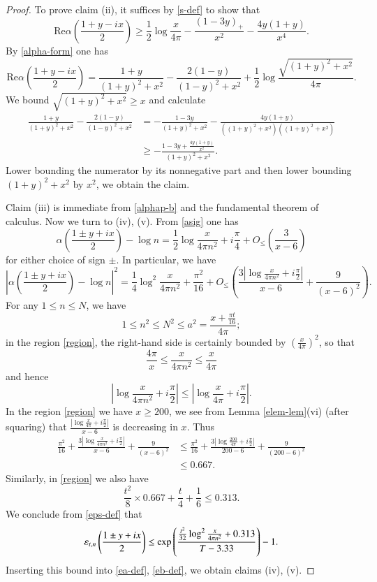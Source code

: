 \begin{proof}
To prove claim (ii), it suffices by \eqref{s-def} to show that
$$ \mathrm{Re} \alpha(\frac{1+y-ix}{2}) \geq \frac{1}{2} \log \frac{x}{4\pi} - \frac{(1-3y)_+}{x^2} - \frac{4y(1+y)}{x^4}.$$
By \eqref{alpha-form} one has
$$ \mathrm{Re} \alpha(\frac{1+y-ix}{2}) = \frac{1+y}{(1+y)^2+x^2} - \frac{2(1-y)}{(1-y)^2+x^2} + \frac{1}{2} \log \frac{\sqrt{(1+y)^2+x^2}}{4\pi}.$$
We bound $\sqrt{(1+y)^2+x^2} \geq x$ and calculate
\begin{align*}
 \frac{1+y}{(1+y)^2+x^2} - \frac{2(1-y)}{(1-y)^2+x^2} &= - \frac{1-3y}{(1+y)^2+x^2} -\frac{4y(1+y)}{((1+y)^2+x^2)((1+y)^2+x^2)} \\
&\geq - \frac{1-3y+\frac{4y(1+y)}{x^2}}{(1+y)^2+x^2}.
\end{align*}
Lower bounding the numerator by its nonnegative part and then lower bounding $(1+y)^2+x^2$ by $x^2$, we obtain the claim.

Claim (iii) is immediate from \eqref{alphap-b} and the fundamental theorem of calculus.  Now we turn to (iv), (v).  From \eqref{asig} one has
$$ \alpha(\frac{1 \pm y + ix}{2}) - \log n = \frac{1}{2} \log \frac{x}{4\pi n^2} + i \frac{\pi}{4} + O_{\leq}\left( \frac{3}{x-6}\right)$$
for either choice of sign $\pm$.  In particular, we have
\begin{equation}\label{alphn}
 |\alpha(\frac{1 \pm y + ix}{2}) - \log n|^2 = \frac{1}{4} \log^2 \frac{x}{4\pi n^2} + \frac{\pi^2}{16} + 
O_{\leq}\left( \frac{3 |\log \frac{x}{4\pi n^2} + i \frac{\pi}{2}|}{x-6} + \frac{9}{(x-6)^2}\right).
\end{equation}
For any $1 \leq n \leq N$, we have
$$ 1 \leq n^2 \leq N^2 \leq a^2 = \frac{x+\frac{\pi t}{16}}{4\pi};$$
in the region \eqref{region}, the right-hand side is certainly bounded by $(\frac{x}{4\pi})^2$, so that
$$ \frac{4\pi}{x} \leq \frac{x}{4\pi n^2} \leq \frac{x}{4\pi}$$
and hence
$$ |\log \frac{x}{4\pi n^2} + i \frac{\pi}{2}| \leq |\log \frac{x}{4\pi} + i \frac{\pi}{2}|.$$
In the region \eqref{region} we have  $x \geq 200$, we see from Lemma \ref{elem-lem}(vi) (after squaring) that $\frac{|\log \frac{x}{4\pi} + i \frac{\pi}{2}|}{x-6}$ is decreasing in $x$.  Thus
\begin{align*}
\frac{\pi^2}{16} + \frac{3 |\log \frac{x}{4\pi n^2} + i \frac{\pi}{2}|}{x-6} + \frac{9}{(x-6)^2}
&\leq \frac{\pi^2}{16} +  \frac{3 |\log \frac{200}{4\pi} + i \frac{\pi}{2}|}{200-6} + \frac{9}{(200-6)^2} \\
&\leq 0.667.
\end{align*}
Similarly, in \eqref{region} we also have
$$ \frac{t^2}{8} \times 0.667 + \frac{t}{4} + \frac{1}{6} \leq 0.313.$$ 
We conclude from \eqref{eps-def} that
$$
\varepsilon_{t,n}\left(\frac{1 \pm y + ix}{2} \right) \leq \exp\left( \frac{\frac{t^2}{32} \log^2 \frac{x}{4\pi n^2} + 0.313}{T-3.33} \right)-1.$$
Inserting this bound into \eqref{ea-def}, \eqref{eb-def}, we obtain claims (iv), (v).


\end{proof}
